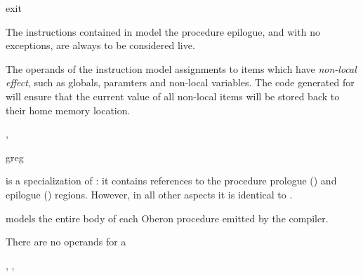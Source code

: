 \begin{instruction}{exit}

  \begin{notes}
    The instructions contained in  model the procedure
    epilogue, and with no exceptions, are always to be considered
    live.

    The operands of the  instruction model assignments
    to items which have \emph{non-local effect}, such as globals,
    \byref paramters and non-local variables.  The code generated for
     will ensure that the current value of all non-local
    items will be stored back to their home memory location.
  \end{notes}

  \nresults


  \begin{seealso}
    , 
  \end{seealso}
\end{instruction}

\begin{instruction}{greg}

  \begin{notes}
     is a specialization of : it contains
    references to the procedure prologue () and
    epilogue () regions.  However, in all other aspects
    it is identical to .

     models the entire body of each Oberon procedure
    emitted by the compiler.
  \end{notes}

  \nresults

  \begin{operands}
  \item There are no operands for a 
  \end{operands}

  \begin{seealso}
    , ,
  \end{seealso}
\end{instruction}

